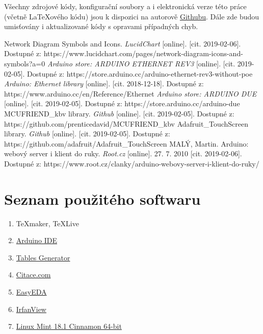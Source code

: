 \documentclass[a4paper,12pt, twoside]{article} %
\begin{document}
Všechny zdrojové kódy, konfigurační soubory a i elektronická verze této práce (včetně  \LaTeX ového  kódu) jsou k dispozici na autorově \href{https://github.com/janzavorka/BP_PROJ}{Githubu}. Dále zde budou umisťovány i aktualizované kódy s opravami případných chyb.
%
\clearpage
\renewcommand{\refname}{Seznam použité literatury a zdrojů informací}
\begin{thebibliography}{99}
Network Diagram Symbols and Icons. \textit{LucidChart} [online]. [cit. 2019-02-06]. Dostupné z: https://www.lucidchart.com/pages/network-diagram-icons-and-symbols?a=0
\textit{Arduino store: ARDUINO ETHERNET REV3} [online]. [cit. 2019-02-05]. Dostupné z: https://store.arduino.cc/arduino-ethernet-rev3-without-poe
\textit{Arduino: Ethernet library} [online]. [cit. 2018-12-18]. Dostupné z: https://www.arduino.cc/en/Reference/Ethernet
\textit{Arduino store: ARDUINO DUE} [online]. [cit. 2019-02-05]. Dostupné z: https://store.arduino.cc/arduino-due
MCUFRIEND\_kbv library. \textit{Github} [online]. [cit. 2019-02-05]. Dostupné z: https://github.com/prenticedavid/MCUFRIEND\_kbv
Adafruit\_TouchScreen library. \textit{Github} [online]. [cit. 2019-02-05]. Dostupné z: https://github.com/adafruit/Adafruit\_TouchScreen
MALÝ, Martin. Arduino: webový server i klient do ruky. \textit{Root.cz} [online]. 27. 7. 2010 [cit. 2019-02-06]. Dostupné z: https://www.root.cz/clanky/arduino-webovy-server-i-klient-do-ruky/
\end{thebibliography}
\clearpage
{} %
\section*{Seznam použitého softwaru}
\begin{enumerate}%
	\item \TeX maker, \TeX Live
	\item \href{https://www.arduino.cc/en/main/software}{Arduino IDE}
	\item \href{https://www.tablesgenerator.com/latex_tables}{Tables Generator}
	\item \href{https://www.citace.com/citace-pro}{Citace.com}
	\item \href{https://easyeda.com/}{EasyEDA}
	\item \href{https://www.irfanview.com/}{IrfanView}
	\item \href{https://linuxmint.com/}{Linux Mint 18.1 Cinnamon 64-bit}
\end{enumerate}
\end{document}
